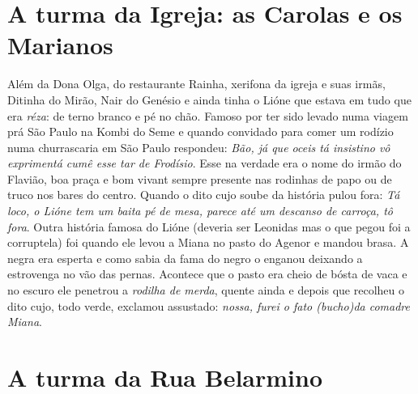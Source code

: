 \documentclass[12pt,brazil,]{book}
\begin{document}
\section{A turma da Igreja: as Carolas e os
Marianos}\label{a-turma-da-igreja-as-carolas-e-os-marianos}

Além da Dona Olga, do restaurante Rainha, xerifona da igreja e suas
irmãs, Ditinha do Mirão, Nair do Genésio e ainda tinha o Lióne que
estava em tudo que era \emph{réza}: de terno branco e pé no chão. Famoso
por ter sido levado numa viagem prá São Paulo na Kombi do Seme e quando
convidado para comer um rodízio numa churrascaria em São Paulo
respondeu: \emph{Bão, já que oceis tá insistino vô exprimentá cumê esse
tar de Frodísio}. Esse na verdade era o nome do irmão do Flavião, boa
praça e bom vivant sempre presente nas rodinhas de papo ou de truco nos
bares do centro. Quando o dito cujo soube da história pulou fora:
\emph{Tá loco, o Lióne tem um baita pé de mesa, parece até um descanso
de carroça, tô fora}. Outra história famosa do Lióne (deveria ser
Leonidas mas o que pegou foi a corruptela) foi quando ele levou a Miana
no pasto do Agenor e mandou brasa. A negra era esperta e como sabia da
fama do negro o enganou deixando a estrovenga no vão das pernas.
Acontece que o pasto era cheio de bósta de vaca e no escuro ele penetrou
a \emph{rodilha de merda}, quente ainda e depois que recolheu o dito
cujo, todo verde, exclamou assustado: \emph{nossa, furei o fato
(bucho)da comadre Miana}.

\section{A turma da Rua Belarmino}\label{a-turma-da-rua-belarmino}
\end{document}
